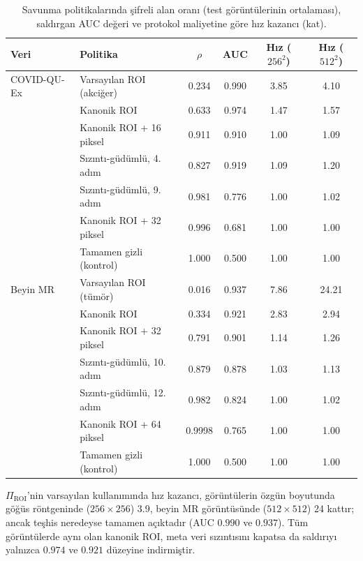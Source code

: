 \begin{table}[h!]
{\setlength{\tabcolsep}{4pt}
\caption{Savunma politikalarında şifreli alan oranı (test görüntülerinin ortalaması), saldırgan AUC değeri ve protokol maliyetine göre hız kazancı (kat).}
\begin{center}
\vspace{-6mm}
{\small
\begin{tabular}{llcccc}
\hline\hline
Veri & Politika & $\rho$ & AUC & Hız ($256^2$) & Hız ($512^2$) \\
\hline
COVID-QU-Ex & Varsayılan ROI (akciğer) & 0.234 & 0.990 & 3.85 & 4.10 \\
 & Kanonik ROI & 0.633 & 0.974 & 1.47 & 1.57 \\
 & Kanonik ROI + 16 piksel & 0.911 & 0.910 & 1.00 & 1.09 \\
 & Sızıntı-güdümlü, 4. adım & 0.827 & 0.919 & 1.09 & 1.20 \\
 & Sızıntı-güdümlü, 9. adım & 0.981 & 0.776 & 1.00 & 1.02 \\
 & Kanonik ROI + 32 piksel & 0.996 & 0.681 & 1.00 & 1.00 \\
 & Tamamen gizli (kontrol) & 1.000 & 0.500 & 1.00 & 1.00 \\
\hline
Beyin MR & Varsayılan ROI (tümör) & 0.016 & 0.937 & 7.86 & 24.21 \\
 & Kanonik ROI & 0.334 & 0.921 & 2.83 & 2.94 \\
 & Kanonik ROI + 32 piksel & 0.791 & 0.901 & 1.14 & 1.26 \\
 & Sızıntı-güdümlü, 10. adım & 0.879 & 0.878 & 1.03 & 1.13 \\
 & Sızıntı-güdümlü, 12. adım & 0.982 & 0.824 & 1.00 & 1.02 \\
 & Kanonik ROI + 64 piksel & 0.9998 & 0.765 & 1.00 & 1.00 \\
 & Tamamen gizli (kontrol) & 1.000 & 0.500 & 1.00 & 1.00 \\
\hline
\end{tabular}}
\vspace{-6mm}
\end{center}
\label{tbl:savunma}}
\end{table}

$\Pi_{\mathrm{ROI}}$'nin varsayılan kullanımında hız kazancı, görüntülerin özgün boyutunda göğüs röntgeninde ($256 \times 256$) 3.9, beyin MR görüntüsünde ($512 \times 512$) 24 kattır; ancak teşhis neredeyse tamamen açıktadır (AUC $0.990$ ve $0.937$). Tüm görüntülerde aynı olan kanonik ROI, meta veri sızıntısını kapatsa da saldırıyı yalnızca $0.974$ ve $0.921$ düzeyine indirmiştir.

